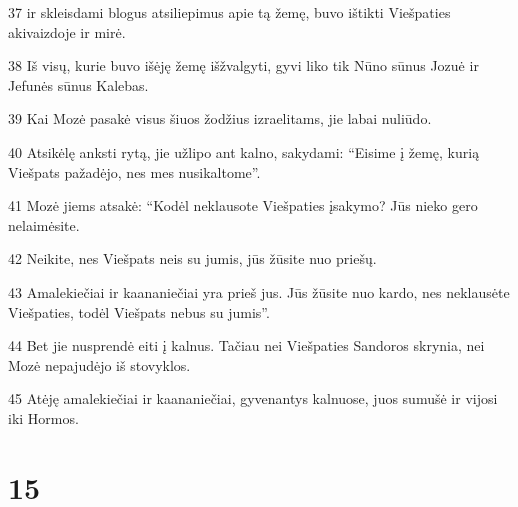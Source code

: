 \par 37 ir skleisdami blogus atsiliepimus apie tą žemę, buvo ištikti Viešpaties akivaizdoje ir mirė. 
\par 38 Iš visų, kurie buvo išėję žemę išžvalgyti, gyvi liko tik Nūno sūnus Jozuė ir Jefunės sūnus Kalebas. 
\par 39 Kai Mozė pasakė visus šiuos žodžius izraelitams, jie labai nuliūdo. 
\par 40 Atsikėlę anksti rytą, jie užlipo ant kalno, sakydami: “Eisime į žemę, kurią Viešpats pažadėjo, nes mes nusikaltome”. 
\par 41 Mozė jiems atsakė: “Kodėl neklausote Viešpaties įsakymo? Jūs nieko gero nelaimėsite. 
\par 42 Neikite, nes Viešpats neis su jumis, jūs žūsite nuo priešų. 
\par 43 Amalekiečiai ir kaananiečiai yra prieš jus. Jūs žūsite nuo kardo, nes neklausėte Viešpaties, todėl Viešpats nebus su jumis”. 
\par 44 Bet jie nusprendė eiti į kalnus. Tačiau nei Viešpaties Sandoros skrynia, nei Mozė nepajudėjo iš stovyklos. 
\par 45 Atėję amalekiečiai ir kaananiečiai, gyvenantys kalnuose, juos sumušė ir vijosi iki Hormos.



\chapter{15}

